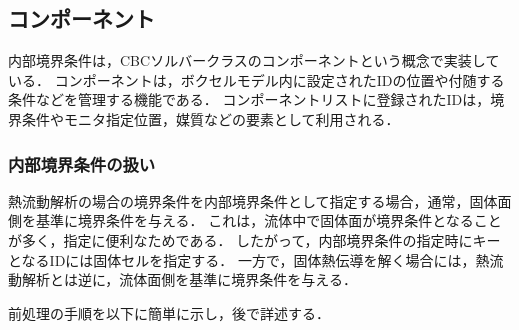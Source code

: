 %
\subsection{コンポーネント}
内部境界条件は，CBCソルバークラスのコンポーネントという概念で実装している．
コンポーネントは，ボクセルモデル内に設定されたIDの位置や付随する条件などを管理する機能である．
コンポーネントリストに登録されたIDは，境界条件やモニタ指定位置，媒質などの要素として利用される．

\subsubsection{内部境界条件の扱い}
熱流動解析の場合の境界条件を内部境界条件として指定する場合，通常，固体面側を基準に境界条件を与える．
これは，流体中で固体面が境界条件となることが多く，指定に便利なためである．
したがって，内部境界条件の指定時にキーとなるIDには固体セルを指定する．
一方で，固体熱伝導を解く場合には，熱流動解析とは逆に，流体面側を基準に境界条件を与える．

前処理の手順を以下に簡単に示し，後で詳述する．

